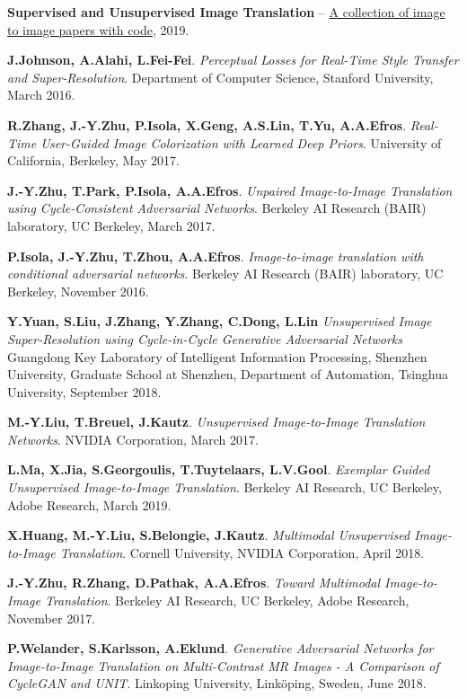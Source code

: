 \documentclass[11pt,a4paper]{extarticle}
\begin{document}
{\begin{thebibliography}{00}
	
	\textbf{Supervised and Unsupervised Image Translation} --
	\href{https://github.com/lzhbrian/image-to-image-papers}{A collection of image to image papers with code},
	2019.

	\textbf{J.Johnson, A.Alahi, L.Fei-Fei}.
	\emph{Perceptual Losses for Real-Time Style Transfer and Super-Resolution}.
	Department of Computer Science, Stanford University,
	March 2016.

	\textbf{R.Zhang, J.-Y.Zhu, P.Isola, X.Geng, A.S.Lin, T.Yu, A.A.Efros}.
	\emph{Real-Time User-Guided Image Colorization with Learned Deep Priors}.
	University of California, Berkeley,
	May 2017.

	\textbf{J.-Y.Zhu, T.Park, P.Isola, A.A.Efros}.
	\emph{Unpaired Image-to-Image Translation using Cycle-Consistent Adversarial Networks}.
	Berkeley AI Research (BAIR) laboratory, UC Berkeley,
	March 2017.

	\textbf{P.Isola, J.-Y.Zhu, T.Zhou, A.A.Efros}.
	\emph{Image-to-image translation with conditional adversarial networks}.
	Berkeley AI Research (BAIR) laboratory, UC Berkeley,
	November 2016.

	\textbf{Y.Yuan, S.Liu, J.Zhang, Y.Zhang, C.Dong, L.Lin}
	\emph{Unsupervised Image Super-Resolution using Cycle-in-Cycle Generative Adversarial Networks}
	Guangdong Key Laboratory of Intelligent Information Processing, Shenzhen University,
	Graduate School at Shenzhen, Department of Automation, Tsinghua University,
	September 2018.

	\textbf{M.-Y.Liu, T.Breuel, J.Kautz}.
	\emph{Unsupervised Image-to-Image Translation Networks}.
	NVIDIA Corporation,
	March 2017.
	
	\textbf{L.Ma, X.Jia, S.Georgoulis, T.Tuytelaars, L.V.Gool}.
	\emph{Exemplar Guided Unsupervised Image-to-Image Translation}.
	Berkeley AI Research, UC Berkeley, Adobe Research,
	March 2019.

	\textbf{X.Huang, M.-Y.Liu, S.Belongie, J.Kautz}.
	\emph{Multimodal Unsupervised Image-to-Image Translation}.
	Cornell University, NVIDIA Corporation,
	April 2018.
	
	\textbf{J.-Y.Zhu, R.Zhang, D.Pathak, A.A.Efros}.
	\emph{Toward Multimodal Image-to-Image Translation}.
	Berkeley AI Research, UC Berkeley, Adobe Research,
	November 2017.
	
	\textbf{P.Welander, S.Karlsson, A.Eklund}.
	\emph{Generative Adversarial Networks for Image-to-Image Translation on Multi-Contrast MR Images - A Comparison of CycleGAN and UNIT}.
	Linkoping University, Linköping, Sweden,
	June 2018.


\end{thebibliography}}
\end{document}
